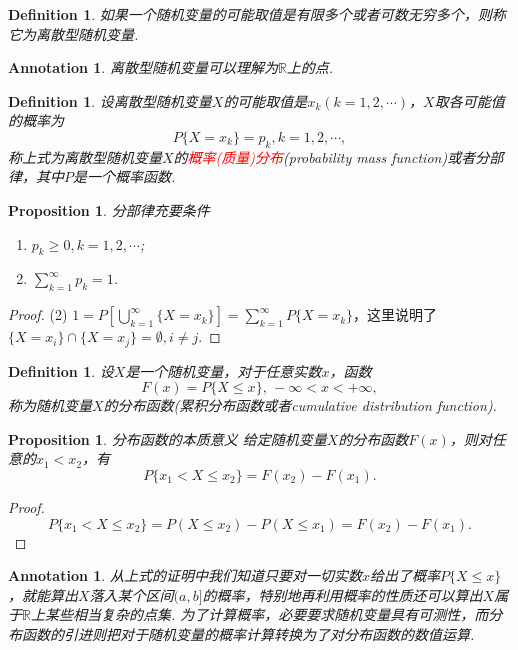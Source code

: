 \documentclass{article}
\newtheorem{proposition}[theorem]{Proposition}
\newtheorem{definition}[theorem]{Definition}
\newtheorem{annotation}[theorem]{Annotation}
\newcommand{\redt}[1]{\textcolor{red}{#1}}
\begin{document}
\begin{definition}
\rm 如果一个随机变量的可能取值是有限多个或者可数无穷多个，则称它为{\color{red}离散型随机变量}.
\end{definition}

\begin{annotation}
\rm 离散型随机变量可以理解为$\mathbb{R}$上的点.
\end{annotation}



\begin{definition}
\rm 设离散型随机变量$X$的可能取值是$x_k(k=1,2,\cdots)$，$X$取各可能值的概率为
$$
P\{X=x_k\} = p_k, k=1,2,\cdots,
$$
称上式为离散型随机变量$X$的\redt{概率(质量)分布}(probability mass function)或者分部律，其中$P$是一个概率函数.
\end{definition}

\begin{proposition}
\rm 分部律充要条件
\begin{enumerate}
	\item $p_k \geq 0,k=1,2,\cdots$;
	\item $\sum\limits_{k=1}^\infty p_k = 1$.
\end{enumerate}
\end{proposition}

\begin{proof}
{\color{red}(2)} $1 = P[\bigcup\limits_{k=1}^{\infty}\{X= x_k\}] = \sum\limits_{k=1}^{\infty} P\{X=x_k\}$，这里说明了$\{X=x_i\} \cap \{X = x_j\} = \emptyset, i \neq j$.
\end{proof}

\begin{definition}
\rm 设$X$是一个随机变量，对于任意实数$x$，函数
$$
F(x) = P\{X \leq x\},\,-\infty < x < +\infty,
$$
称为随机变量$X$的分布函数(累积分布函数或者cumulative distribution function). 
\end{definition}

\begin{proposition}
\rm {\color{red} 分布函数的本质意义} 给定随机变量$X$的分布函数$F(x)$，则对任意的$x_1 < x_2$，有
$$
P\{x_1 < X \leq x_2\} = F(x_2) - F(x_1).
$$
\end{proposition}

\begin{proof}
$$
P\{x_1 < X \leq x_2\} = P(X \leq x_2) - P(X \leq x_1) = F(x_2)-F(x_1).
$$
\end{proof}

\begin{annotation}
\rm {\color{blue}从上式的证明中我们知道只要对一切实数$x$给出了概率$P\{X \leq x\}$，就能算出$X$落入某个区间$(a,b]$的概率，特别地再利用概率的性质还可以算出$X$属于$\mathbb{R}$上某些相当复杂的点集}. 为了计算概率，必要要求随机变量具有可测性，而分布函数的引进则把对于随机变量的概率计算转换为了对分布函数的数值运算. 
\end{annotation}
\end{document}

